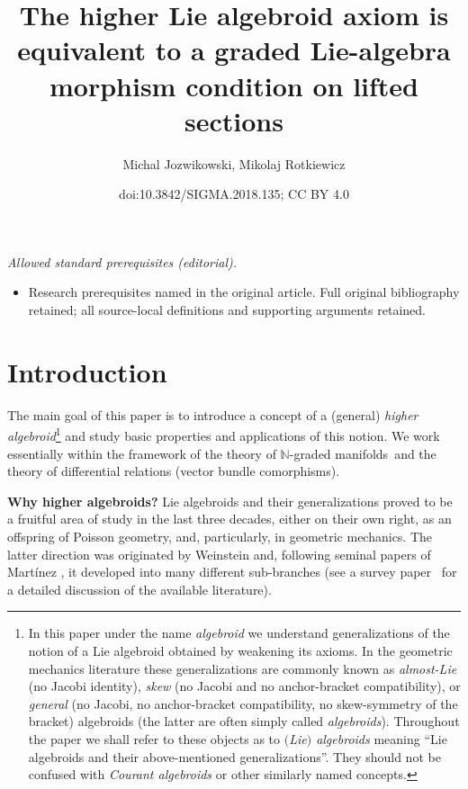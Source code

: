 \documentclass[10pt,a4paper]{amsart}
\title{The higher Lie algebroid axiom is equivalent to a graded Lie-algebra morphism condition on lifted sections}
\author{Michal Jozwikowski, Mikolaj Rotkiewicz}
\date{doi:10.3842/SIGMA.2018.135; CC BY 4.0}
\newcommand{\grBs}{{$\N$-graded manifolds}}
\newcommand{\Zakrzewski}{{vector bundle comorphism}}
\newcommand{\N}{\mathbb{N}}
\numberwithin{equation}{section}
\theoremstyle{definition}
\begin{document}
\maketitle
\noindent\textit{Allowed standard prerequisites (editorial).}\begin{itemize}
\item Research prerequisites named in the original article. Full original bibliography retained; all source-local definitions and supporting arguments retained.
\end{itemize}\medskip
\section{Introduction}\label{sec:intro}

 The main goal of this paper is to introduce a concept of a (general) \emph{higher algebroid}\footnote{In this paper under the name \emph{algebroid} we understand generalizations of the notion of a Lie algebroid obtained by weakening its axioms. In the geometric mechanics literature these generalizations are commonly known as \emph{almost-Lie} (no Jacobi identity), \emph{skew} (no Jacobi and no anchor-bracket compatibility), or \emph{general} (no Jacobi, no anchor-bracket compatibility, no skew-symmetry of the bracket) algebroids (the latter are often simply called \emph{algebroids}). Throughout the paper we shall refer to these objects as to \emph{$($Lie$)$ algebroids} meaning ``Lie algebroids and their above-mentioned generalizations''. They should not be confused with \emph{Courant algebroids} or other similarly named concepts.\label{foot:algebroid}} and study basic properties and applications of this notion. We work essentially within the framework of the theory of \grBs\ and the theory of differential relations (\Zakrzewski s).

{\bf Why higher algebroids?} Lie algebroids and their generalizations proved to be a fruitful area of study in the last three decades, either on their own right, as an offspring of Poisson geometry, and, particularly, in geometric mechanics. The latter direction was originated by Weinstein \cite{Weinstein_1996} and, following seminal papers of Mart\'{i}nez \cite{Martinez_geom_form_mech_lie_alg_2001, Martinez_lagr_mech_lie_alg_2001}, it developed into many different sub-branches (see a survey paper~\cite{Cortes_Inn_survey_2006} for a detailed discussion of the available literature).
\end{document}
